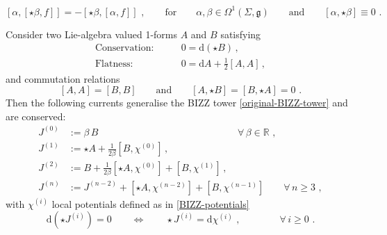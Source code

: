\documentclass[10pt,a4paper]{amsart}
\begin{document}
\begin{equation}\label{useful-Jacobi-2}
[\alpha,[\star \beta,f]]=-[\star \beta,[\alpha,f]] \,\, ,
\qquad \text{for} \qquad \alpha,\beta\in \Omega^{1}(\Sigma,\mathfrak{g}) \qquad \text{and} \qquad
[\alpha,\star\beta]\equiv0 \,\, .
\end{equation}

\begin{thm}\label{gBIZZ-theorem}
Consider two Lie-algebra valued 1-forms $A$ and $B$ satisfying
\begin{equation}\label{A,B-definition}
\begin{aligned}
\text{Conservation:}& \qquad
0=\mathrm{d}(\star B)  \, ,
\\
\text{Flatness:}& \qquad 0=\mathrm{d}A+\tfrac{1}{2}[A,A] \, ,
\end{aligned}
\end{equation}
and commutation relations
\begin{equation}\label{A,B-commutators}
[A,A]=[B,B]
\qquad \text{and} \qquad 
[A,\star B]=[B,\star A]=0 \,\, .
\end{equation}
Then the following currents generalise the BIZZ tower \eqref{original-BIZZ-tower} and are conserved:
\begin{equation}\label{generalised-BIZZ-tower}
\begin{aligned}
J^{(0)}&:=\beta \, B \qquad \qquad \qquad \qquad \qquad \qquad \quad \quad \,\, \forall \, \beta \in \mathbb{R}\,\, ,
\\
J^{(1)}&:= \star A + \tfrac{1}{2\beta}[B,\chi^{(0)}] \, ,
\\
J^{(2)}&:=B+\tfrac{1}{2\beta}[\star A,\chi^{(0)}]+[B,\chi^{(1)}] \, ,
\\
J^{(n)}&:=J^{(n-2)}+[\star A,\chi^{(n-2)}]+[B,\chi^{(n-1)}] \qquad \forall \, n\geq 3 \,\, ,
\end{aligned}
\end{equation}
with $\chi^{(i)}$ local potentials defined as in \eqref{BIZZ-potentials}
\begin{equation}\label{gBIZZ-potentials}
\mathrm{d}(\star J^{(i)})=0 
\qquad \Longleftrightarrow \qquad
\star J^{(i)}=\mathrm{d}\chi^{(i)} \,\, , 
\qquad \qquad \forall \, i\geq 0
\,\, .
\end{equation}
\end{thm}
\end{document}
